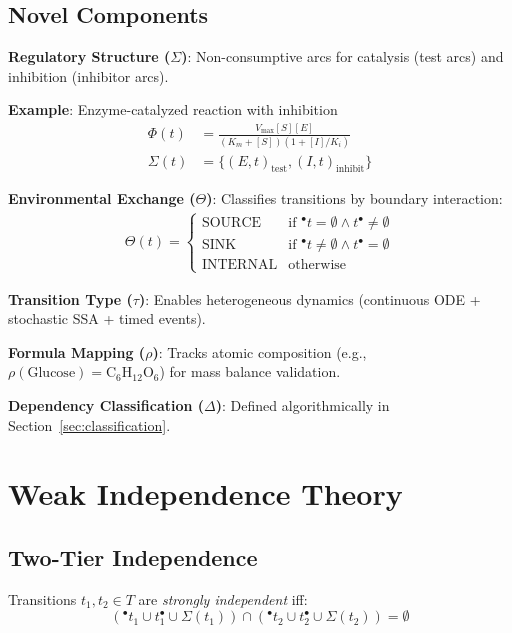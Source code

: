 \documentclass[runningheads]{llncs}
\newcommand{\preset}[1]{\ensuremath{{}^{\bullet}#1}}
\newcommand{\postset}[1]{\ensuremath{#1^{\bullet}}}
\newcommand{\RegSet}[1]{\ensuremath{\Sigma(#1)}}
\begin{document}
\subsection{Novel Components}

\textbf{Regulatory Structure ($\Sigma$)}: Non-consumptive arcs for catalysis (test arcs) and inhibition (inhibitor arcs).

\textbf{Example}: Enzyme-catalyzed reaction with inhibition
\begin{align}
\Phi(t) &= \frac{V_{\max} [S] [E]}{(K_m + [S])(1 + [I]/K_i)} \\
\Sigma(t) &= \{(E,t)_{\text{test}}, (I,t)_{\text{inhibit}}\}
\end{align}

\textbf{Environmental Exchange ($\Theta$)}: Classifies transitions by boundary interaction:
\begin{align}
\Theta(t) = \begin{cases}
\text{SOURCE} & \text{if } \preset{t} = \emptyset \land \postset{t} \neq \emptyset \\
\text{SINK} & \text{if } \preset{t} \neq \emptyset \land \postset{t} = \emptyset \\
\text{INTERNAL} & \text{otherwise}
\end{cases}
\end{align}

\textbf{Transition Type ($\tau$)}: Enables heterogeneous dynamics (continuous ODE + stochastic SSA + timed events).

\textbf{Formula Mapping ($\rho$)}: Tracks atomic composition (e.g., $\rho(\text{Glucose}) = \text{C}_6\text{H}_{12}\text{O}_6$) for mass balance validation.

\textbf{Dependency Classification ($\Delta$)}: Defined algorithmically in Section~\ref{sec:classification}.

\section{Weak Independence Theory}

\subsection{Two-Tier Independence}

\begin{definition}
Transitions $t_1, t_2 \in T$ are \emph{strongly independent} iff:
\begin{equation}
(\preset{t_1} \cup \postset{t_1} \cup \RegSet{t_1}) \cap (\preset{t_2} \cup \postset{t_2} \cup \RegSet{t_2}) = \emptyset
\end{equation}
\end{definition}
\end{document}
